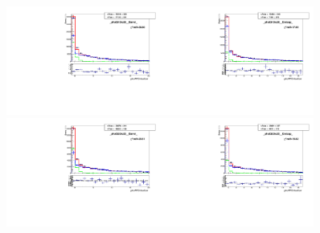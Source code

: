 \begin{figure}[htb]
  \begin{center}
   \includegraphics[width=0.45\textwidth]{../figs/figs_v11/MUON_WGamma/TemplateFits/c_TEMPL_CHISO_UNblind__phoEt15to20__Barrel__RooFit.pdf}\includegraphics[width=0.45\textwidth]{../figs/figs_v11/MUON_WGamma/TemplateFits/c_TEMPL_CHISO_UNblind__phoEt15to20__Endcap__RooFit.pdf}\\
   \includegraphics[width=0.45\textwidth]{../figs/figs_v11/MUON_WGamma/TemplateFits/c_TEMPL_CHISO_UNblind__phoEt20to25__Barrel__RooFit.pdf}\includegraphics[width=0.45\textwidth]{../figs/figs_v11/MUON_WGamma/TemplateFits/c_TEMPL_CHISO_UNblind__phoEt20to25__Endcap__RooFit.pdf}\\

\end{center}
\end{figure}
